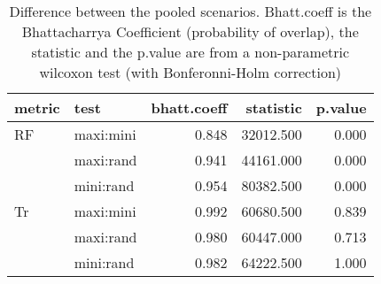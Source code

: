 \begin{table}[ht]
\centering
\begin{tabular}{llr|rr}
  \hline
metric & test & bhatt.coeff & statistic & p.value \\ 
  \hline
RF & maxi:mini & 0.848 & 32012.500 & 0.000 \\ 
   & maxi:rand & 0.941 & 44161.000 & 0.000 \\ 
   & mini:rand & 0.954 & 80382.500 & 0.000 \\ 
  Tr & maxi:mini & 0.992 & 60680.500 & 0.839 \\ 
   & maxi:rand & 0.980 & 60447.000 & 0.713 \\ 
   & mini:rand & 0.982 & 64222.500 & 1.000 \\ 
   \hline
\end{tabular}
\caption{Difference between the pooled scenarios. Bhatt.coeff is the Bhattacharrya Coefficient (probability of overlap), the statistic and the p.value are from a non-parametric wilcoxon test (with Bonferonni-Holm correction)} 
\label{Tab_pooledscenarios_test}
\end{table}
